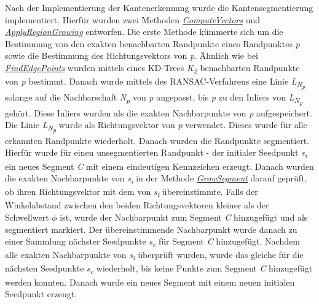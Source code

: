 Nach der Implementierung der Kantenerkennung wurde die Kantensegmentierung implementiert. Hierfür wurden zwei Methoden \textit{\hyperref[alg:compute_vectors]{ComputeVectors}} und \textit{\hyperref[alg:apply_region_growing]{ApplyRegionGrowing}} entworfen. Die erste Methode kümmerte sich um die Bestimmung von den exakten benachbarten Randpunkte eines Randpunktes \textit{p} sowie die Bestimmung des Richtungsvektors von \textit{p}. Ähnlich wie bei \textit{\hyperref[alg:find_edge_points]{FindEdgePoints}} wurden mittels eines KD-Trees \textit{K\textsubscript{2}} benachbarten Randpunkte von \textit{p} bestimmt. Danach wurde mittels des RANSAC-Verfahrens eine Linie \textit{L\textsubscript{N\textsubscript{p}}} solange auf die Nachbarschaft \textit{N\textsubscript{p}} von \textit{p} angepasst, bis \textit{p} zu den Inliers von \textit{L\textsubscript{N\textsubscript{p}}} gehört. Diese Inliers wurden als die exakten Nachbarpunkte von \textit{p} aufgespeichert. Die Linie \textit{L\textsubscript{N\textsubscript{p}}} wurde als Richtungsvektor von \textit{p} verwendet. Dieses wurde für alle erkannten Randpunkte wiederholt. Danach wurden die Randpunkte segmentiert. Hierfür wurde für einen unsegmentierten Randpunkt - der initialer Seedpunkt \textit{s\textsubscript{i}} ein neues Segment \textit{C} mit einem eindeutigen Kennzeichen erzeugt. Danach wurden die exakten Nachbarpunkte von \textit{s\textsubscript{i}} in der Methode \textit{\hyperref[alg:grow_segment]{GrowSegment}} darauf geprüft, ob ihren Richtungsvektor mit dem von \textit{s\textsubscript{i}} übereinstimmte. Falls der Winkelabstand zwischen den beiden Richtungsvektoren kleiner als der Schwellwert \textit{$\phi$} ist, wurde der Nachbarpunkt zum Segment \textit{C} hinzugefügt und als segmentiert markiert. Der übereinstimmende Nachbarpunkt wurde danach zu einer Sammlung nächster Seedpunkte \textit{s\textsubscript{c}} für Segment \textit{C} hinzugefügt. Nachdem alle exakten Nachbarpunkte von \textit{s\textsubscript{i}} überprüft wurden, wurde das gleiche für die nächsten Seedpunkte \textit{s\textsubscript{c}} wiederholt, bis keine Punkte zum Segment \textit{C} hinzugefügt werden konnten. Danach wurde ein neues Segment mit einem neuen initialen Seedpunkt erzeugt.

